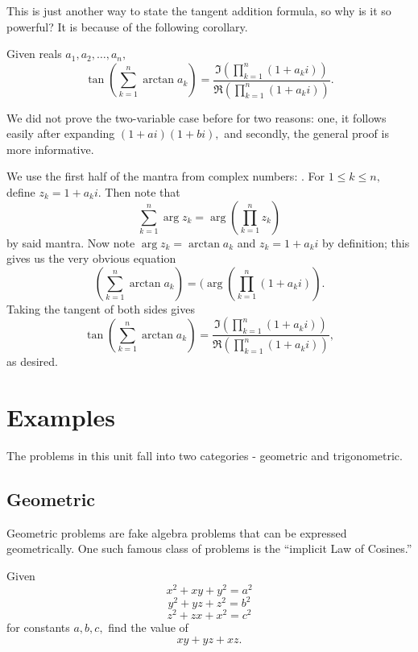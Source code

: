 \documentclass[blue,onecol]{shooting}
\begin{document}
This is just another way to state the tangent addition formula, so why is it so powerful? It is because of the following corollary.

\begin{corollary}
Given reals $a_1,a_2,\ldots,a_n,$
\[\tan\left(\sum_{k=1}^n \arctan a_k\right) = \frac{\Im\left(\prod\limits_{k=1}^n (1+a_ki)\right)}{\Re\left(\prod\limits_{k=1}^n (1+a_ki)\right)}.\]
\end{corollary}

We did not prove the two-variable case before for two reasons: one, it follows easily after expanding $(1+ai)(1+bi),$ and secondly, the general proof is more informative.

\begin{pro}
We use the first half of the mantra from complex numbers: . For $1\leq k\leq n,$ define $z_k=1+a_ki.$ Then note that
\[\sum_{k=1}^n\arg z_k=\arg\left(\prod\limits_{k=1}^n z_k\right)\]
by said mantra. Now note $\arg z_k=\arctan a_k$ and $z_k=1+a_ki$ by definition; this gives us the very obvious equation
\[\left(\sum_{k=1}^n \arctan a_k\right) = (\arg\left(\prod\limits_{k=1}^n (1+a_ki)\right).\]
Taking the tangent of both sides gives
\[\tan\left(\sum_{k=1}^n \arctan a_k\right) = \frac{\Im\left(\prod\limits_{k=1}^n (1+a_ki)\right)}{\Re\left(\prod\limits_{k=1}^n (1+a_ki)\right)},\]
as desired.
\end{pro}

\pagebreak

\section{Examples}
The problems in this unit fall into two categories - geometric and trigonometric.

\subsection{Geometric}
Geometric problems are fake algebra problems that can be expressed geometrically. One such famous class of problems is the ``implicit Law of Cosines.''

\begin{exam}
Given
\[x^2+xy+y^2=a^2\]
\[y^2+yz+z^2=b^2\]
\[z^2+zx+x^2=c^2\]
for constants $a,b,c,$ find the value of
\[xy+yz+xz.\]
\end{exam}
\end{document}
